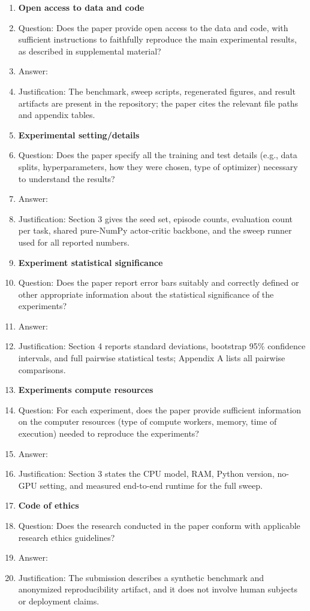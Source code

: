 \begin{enumerate}
\item {\bf Open access to data and code}
    \item[] Question: Does the paper provide open access to the data and code, with sufficient instructions to faithfully reproduce the main experimental results, as described in supplemental material?
    \item[] Answer: \answerYes{}
    \item[] Justification: The benchmark, sweep scripts, regenerated figures, and result artifacts are present in the repository; the paper cites the relevant file paths and appendix tables.

\item {\bf Experimental setting/details}
    \item[] Question: Does the paper specify all the training and test details (e.g., data splits, hyperparameters, how they were chosen, type of optimizer) necessary to understand the results?
    \item[] Answer: \answerYes{}
    \item[] Justification: Section 3 gives the seed set, episode counts, evaluation count per task, shared pure-NumPy actor-critic backbone, and the sweep runner used for all reported numbers.

\item {\bf Experiment statistical significance}
    \item[] Question: Does the paper report error bars suitably and correctly defined or other appropriate information about the statistical significance of the experiments?
    \item[] Answer: \answerYes{}
    \item[] Justification: Section 4 reports standard deviations, bootstrap 95\% confidence intervals, and full pairwise statistical tests; Appendix A lists all pairwise comparisons.

\item {\bf Experiments compute resources}
    \item[] Question: For each experiment, does the paper provide sufficient information on the computer resources (type of compute workers, memory, time of execution) needed to reproduce the experiments?
    \item[] Answer: \answerYes{}
    \item[] Justification: Section 3 states the CPU model, RAM, Python version, no-GPU setting, and measured end-to-end runtime for the full sweep.

\item {\bf Code of ethics}
    \item[] Question: Does the research conducted in the paper conform with applicable research ethics guidelines?
    \item[] Answer: \answerYes{}
    \item[] Justification: The submission describes a synthetic benchmark and anonymized reproducibility artifact, and it does not involve human subjects or deployment claims.


\end{enumerate}
